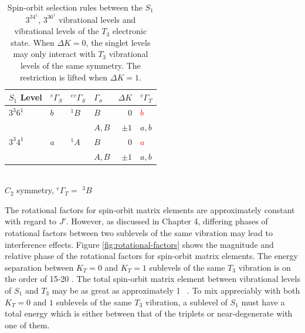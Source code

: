 \documentclass[12pt]{mitthesis}
\begin{document}
\begin{table}
  \caption{Spin-orbit selection rules between the $S_1$ $3^34^1$,
    $3^36^1$ vibrational levels and vibrational levels of the $T_3$
    electronic state.  When $\Delta K=0$, the singlet levels may only
    interact with $T_3$ vibrational levels of the same symmetry.  The
    restriction is lifted when $\Delta K=1$.
  }
  \label{table:delta-k}
  \centering
  \begin{tabular}{llllrl}
    \\
    $S_1$ Level
    & $^{v}\Gamma_S$ & $^{ev}\Gamma_S$ & $\Gamma_\sigma$ & $\Delta K$ & $^{v}\Gamma_T$ \\
    \toprule
    
    $3^3 6^1$ 
    & $b$ & $^{1}B$ & $B$ & $0$ & \textcolor{red}{$b$} \\
    & & & $A, B$ & $\pm1$ & $a, b$ \\
    
    $3^3 4^1$ 
    & $a$ & $^{1}A$ & $B$ & $0$ & \textcolor{red}{$a$} \\
    & & & $A, B$ & $\pm1$ & $a, b$ \\[10pt]
    
  \end{tabular}\\[5mm]
  
  $C_{2}$ symmetry, $^{e}\Gamma_T =$ $^{3}B$
\end{table}

The rotational factors for spin-orbit matrix elements are
approximately constant with regard to $J'$.  However, as discussed in
Chapter 4, differing phases of rotational factors between two
sublevels of the same vibration may lead to interference effects.
Figure \ref{fig:rotational-factors} shows the magnitude and relative
phase of the rotational factors for spin-orbit matrix elements.  The
energy separation between $K_T=0$ and $K_T=1$ sublevels of the same
$T_3$ vibration is on the order of 15-20 \rcm \cite{thom07}.  The
total spin-orbit matrix element between vibrational levels of $S_1$
and $T_3$ may be as great as approximately 1 \rcm\ \cite{thom07}.  To
mix appreciably with both $K_T=0$ and $1$ sublevels of the same $T_3$
vibration, a sublevel of $S_1$ must have a total energy which is
either between that of the triplets or near-degenerate with one of
them.

\end{document}
